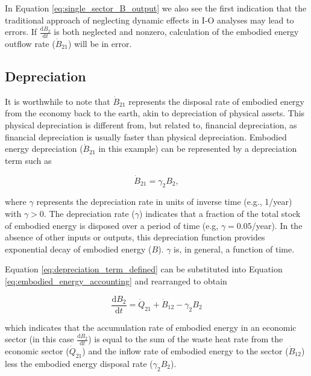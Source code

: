 \documentclass[authoryear,preprint,review,12pt]{elsarticle}
\begin{document}
In Equation \ref{eq:single_sector_B_output} we also see the first indication that the traditional approach of neglecting dynamic effects in I-O analyses may lead to errors. If $\frac{\mathrm{d}B_2}{\mathrm{d}t}$ is both neglected and nonzero, calculation of the embodied energy outflow rate ($\dot{B}_{21}$) will be in error.

\subsection{Depreciation}

It is worthwhile to note that $\dot{B}_{21}$ represents the disposal rate of embodied energy from the economy back to the earth, akin to depreciation of physical assets. This physical depreciation is different from, but related to, financial depreciation, as financial depreciation is usually faster than physical depreciation. Embodied energy depreciation ($\dot{B}_{21}$ in this example) can be represented by a depreciation term such as

\begin{equation} \label{eq:depreciation_term_defined}
	\dot{B}_{21} = \gamma_{2}B_{2},
\end{equation}

\noindent where $\gamma$ represents the depreciation rate in units of inverse time (e.g., 1/year) with $\gamma > 0$. The depreciation rate ($\gamma$) indicates that a fraction of the total stock of embodied energy is disposed over a period of time (e.g, $\gamma = 0.05$/year). In the absence of other inputs or outputs, this depreciation function provides exponential decay of embodied energy ($B$). $\gamma$ is, in general, a function of time.

Equation \ref{eq:depreciation_term_defined} can be substituted into Equation \ref{eq:embodied_energy_accounting} and rearranged to obtain 

\begin{equation} \label{eq:dB2/dt_single_sector_with_depreciation_gamma}
	\frac{\mathrm{d}B_{2}}{\mathrm{d}t} =  \dot{Q}_{21} + \dot{B}_{12} - \gamma_{2}B_{2}
\end{equation}

\noindent which indicates that the accumulation rate of embodied energy in an economic sector (in this case $\frac{\mathrm{d}B_{2}}{\mathrm{d}t}$) is equal to the sum of the waste heat rate from the economic sector ($\dot{Q}_{21}$) and the inflow rate of embodied energy to the sector ($\dot{B}_{12}$) less the embodied energy disposal rate ($\gamma_{2}B_{2}$).
\end{document}
